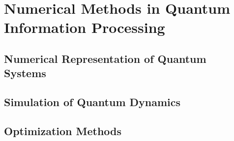 \chapter{Numerical Methods in Quantum Information Processing}

\section{Numerical Representation of Quantum Systems}

\section{Simulation of Quantum Dynamics}

\section{Optimization Methods}
